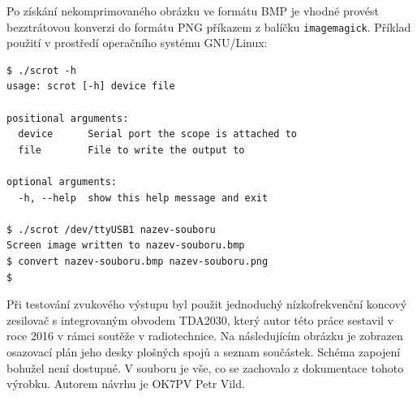 Po získání nekomprimovaného obrázku ve formátu BMP je vhodné provést
bezztrátovou konverzi do formátu PNG příkazem  z balíčku
\texttt{imagemagick}.
Příklad použití v prostředí operačního systému GNU/Linux:
\begin{lstlisting}[style=terminal]
$ ./scrot -h
usage: scrot [-h] device file

positional arguments:
  device      Serial port the scope is attached to
  file        File to write the output to

optional arguments:
  -h, --help  show this help message and exit

$ ./scrot /dev/ttyUSB1 nazev-souboru
Screen image written to nazev-souboru.bmp
$ convert nazev-souboru.bmp nazev-souboru.png
$
\end{lstlisting}




\clearpage
{}
\label{app:TDA2030}
Při testování zvukového výstupu byl použit jednoduchý nízkofrekvenční koncový
zesilovač s integrovaným obvodem TDA2030, který autor této práce sestavil
v roce 2016 v rámci soutěže v radiotechnice. Na následujícím obrázku je
zobrazen osazovací plán jeho desky plošných spojů a seznam součástek. Schéma
zapojení bohužel není dostupné.
V souboru  je vše, co se zachovalo
z dokumentace tohoto výrobku. Autorem návrhu je OK7PV Petr Vild.

